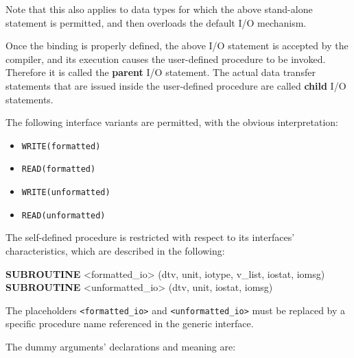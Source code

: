 \documentclass[
]{article}
\newenvironment{Shaded}{}{}
\newcommand{\KeywordTok}[1]{\textcolor[rgb]{0.00,0.44,0.13}{\textbf{#1}}}
\newcommand{\NormalTok}[1]{#1}
\newcommand{\OperatorTok}[1]{\textcolor[rgb]{0.40,0.40,0.40}{#1}}
\providecommand{\tightlist}{%
  \setlength{\itemsep}{0pt}\setlength{\parskip}{0pt}}
\begin{document}
Note that this also applies to data types for which the above
stand-alone statement is permitted, and then overloads the default I/O
mechanism.

Once the binding is properly defined, the above I/O statement is
accepted by the compiler, and its execution causes the user-defined
procedure to be invoked. Therefore it is called the \textbf{parent} I/O
statement. The actual data transfer statements that are issued inside
the user-defined procedure are called \textbf{child} I/O statements.

The following interface variants are permitted, with the obvious
interpretation:

\begin{itemize}
\tightlist
\item
  \texttt{WRITE(formatted)}
\item
  \texttt{READ(formatted)}
\item
  \texttt{WRITE(unformatted)}
\item
  \texttt{READ(unformatted)}
\end{itemize}

The self-defined procedure is restricted with respect to its interfaces'
characteristics, which are described in the following:

\begin{Shaded}
\begin{Highlighting}[]
\KeywordTok{SUBROUTINE} \OperatorTok{\textless{}}\NormalTok{formatted\_io}\OperatorTok{\textgreater{}}\NormalTok{   (dtv, unit, iotype, v\_list, iostat, iomsg)}
\KeywordTok{SUBROUTINE} \OperatorTok{\textless{}}\NormalTok{unformatted\_io}\OperatorTok{\textgreater{}}\NormalTok{ (dtv, unit,                 iostat, iomsg)}
\end{Highlighting}
\end{Shaded}

The placeholders \texttt{\textless{}formatted\_io\textgreater{}} and
\texttt{\textless{}unformatted\_io\textgreater{}} must be replaced by a
specific procedure name referenced in the generic interface.

The dummy arguments' declarations and meaning are:
\end{document}
